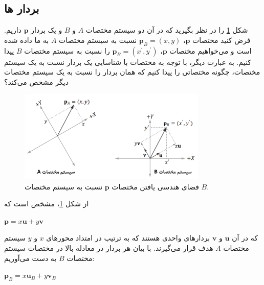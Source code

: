 \subsection{\textbf{بردار ها}}
\label{subsec:3.4.1}
{
    \Large
    \begin{spacing}{1.5}
        شکل \ref{fig:4.Session.1.3.11} را در نظر بگیرید که در آن دو سیستم مختصات $A$ و $B$ و یک بردار $\textbf{p}$ داریم.
        فرض کنید مختصات $\textbf{p}$، $\textbf{p}_{B}=(x, y)$ نسبت به سیستم مختصات $A$ به ما داده شده است
        و می‌خواهیم مختصات $\textbf{p}$، $\textbf{p}_{B}=(x^\prime, y^\prime)$ را نسبت به سیستم مختصات $B$ پیدا کنیم.
        به عبارت دیگر، با توجه به مختصات با شناسایی یک بردار نسبت به یک سیستم مختصات، چگونه مختصاتی را پیدا کنیم که همان بردار را نسبت به یک سیستم مختصات دیگر مشخص می‌کند؟

        \begin{figure}[H]
            \centering
            \setlength{\belowcaptionskip}{-10pt}
            \includegraphics[width=0.8\textwidth]{Images/4/3/4.Session.1.3.11}
            \caption {فضای هندسی یافتن مختصات $\textbf{p}$ نسبت به سیستم مختصات $B$.}
            \label{fig:4.Session.1.3.11}
        \end{figure}

        از شکل \ref{fig:4.Session.1.3.11}، مشخص است که

        \begin{center}
            $\textbf{p}=x\textbf{u}+y\textbf{v}$
        \end{center}

        که در آن $\textbf{u}$ و $\textbf{v}$ بردارهای واحدی هستند که به ترتیب در امتداد محورهای $x$ و $y$ سیستم مختصات $A$ هدف قرار می‌گیرند.
        با بیان هر بردار در معادله بالا در مختصات سیستم مختصات $B$ به دست می‌آوریم:

        \begin{center}
            $\textbf{p}_{B}=x\textbf{u}_{B}+y\textbf{v}_{B}$
        \end{center}


\end{spacing}}
